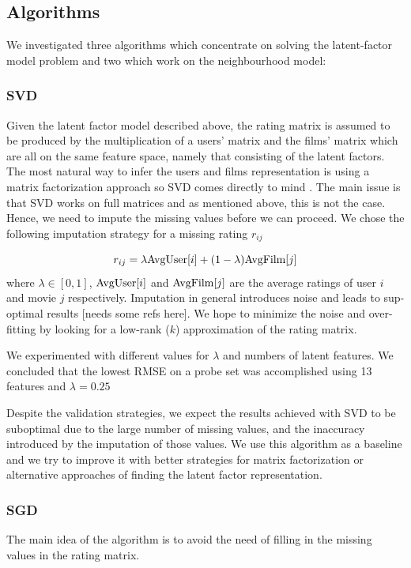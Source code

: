 \documentclass[10pt,conference,compsocconf]{IEEEtran}
\begin{document}
\subsection{Algorithms}
We investigated three algorithms which concentrate on solving the latent-factor model problem and two which work on the neighbourhood model:

\subsubsection*{\textbf{SVD}} Given the latent factor model described above, the rating matrix is assumed to be produced by the multiplication of a users' matrix and the films' matrix which are all on the same feature space, namely that consisting of the latent factors. The most natural way to infer the users and films representation is using a matrix factorization approach so SVD comes directly to mind \cite{Koren09matrixfactorization}. The main issue is that SVD works on full matrices and as mentioned above, this is not the case. Hence, we need to impute the missing values before we can proceed. We chose the following imputation strategy for a missing rating $r_{ij}$

\begin{equation}
r_{ij}= \lambda \textnormal{AvgUser}[i] + (1 - \lambda) \textnormal{AvgFilm}[j]
\label{eq:imputation}
\end{equation}
where $\lambda \in [0,1]$, $\textnormal{AvgUser}[i]$ and $\textnormal{AvgFilm}[j]$ are the average ratings of user $i$ and movie $j$ respectively. Imputation in general introduces noise and leads to sup-optimal results [needs some refs here]. We hope to minimize the noise and over-fitting by looking for a low-rank ($k$) approximation of the rating matrix. 

We experimented with different values for $\lambda$ and numbers of latent features. We concluded that the lowest RMSE on a probe set was accomplished using 13 features and $\lambda = 0.25$

Despite the validation strategies, we expect the results achieved with SVD to be suboptimal due to the large number of missing values, and the inaccuracy introduced by the imputation of those values. We use this algorithm as a baseline and we try to improve it with better strategies for matrix factorization or alternative approaches of finding the latent factor representation.

\subsubsection*{\textbf{SGD}} The main idea of the algorithm is to avoid the need of filling in the missing values in the rating matrix. 
\end{document}
